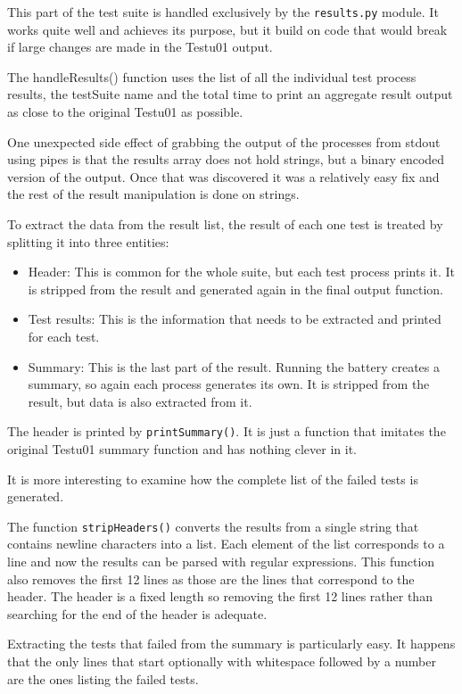 This part of the test suite is handled exclusively by the \texttt{results.py} module. It works quite well and achieves its purpose, but it build on code that would break if large changes are made in the Testu01 output.

The handleResults() function uses the list of all the individual test process results, the testSuite name and the total time to print an aggregate result output as close to the original Testu01 as possible.

One unexpected side effect of grabbing the output of the processes from stdout using pipes is that the results array does not hold strings, but a binary encoded version of the output. Once that was discovered it was a relatively easy fix and the rest of the result manipulation is done on strings.

To extract the data from the result list, the result of each one test is treated by splitting it into three entities:
\begin{itemize}
  \item Header: This is common for the whole suite, but each test process prints it. It is stripped from the result and generated again in the final output function.
  \item Test results: This is the information that needs to be extracted and printed for each test. 
  \item Summary: This is the last part of the result. Running the battery creates a summary, so again each process generates its own. It is stripped from the result, but data is also extracted from it.
\end{itemize}

The header is printed by \texttt{printSummary()}. It is just a function that imitates the original Testu01 summary function and has nothing clever in it.

It is more interesting to examine how the complete list of the failed tests is generated.

The function \texttt{stripHeaders()} converts the results from a single string that contains newline characters into a list. Each element of the list corresponds to a line and now the results can be parsed with regular expressions. This function also removes the first 12 lines as those are the lines that correspond to the header. The header is a fixed length so removing the first 12 lines rather than searching for the end of the header is adequate.

Extracting the tests that failed from the summary is particularly easy. It happens that the only lines that start optionally with whitespace followed by a number are the ones listing the failed tests.

